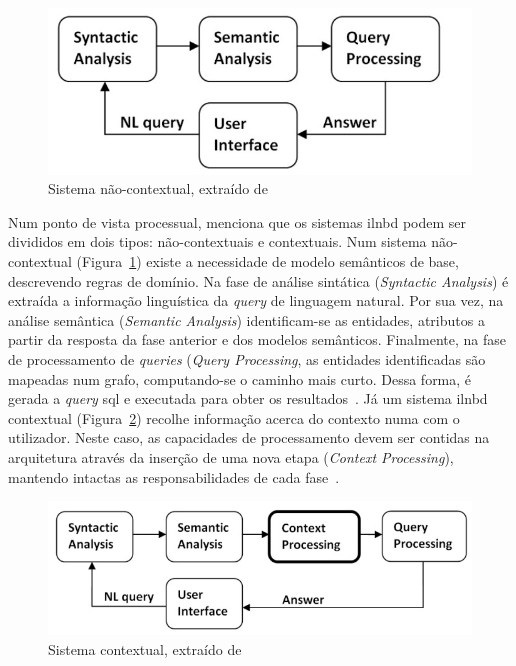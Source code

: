 \begin{figure}[!h]
    \centering
    \includegraphics[width=.6\textwidth]{ch03/assets/non_contextual_nlidb.jpg}
    \caption{Sistema  não-contextual, extraído de~\textcite{novel_approach_towards_incorporating_context_processing_nlidb}}
    \label{fig:noncontextual_nlidb}
\end{figure}

Num ponto de vista processual, \textcite{novel_approach_towards_incorporating_context_processing_nlidb} menciona que os sistemas \gls{ilnbd} podem ser divididos em dois tipos: não-contextuais e contextuais. Num sistema não-contextual (Figura~\ref{fig:noncontextual_nlidb}) existe a necessidade de modelo semânticos de base, descrevendo regras de domínio. Na fase de análise sintática (\textit{Syntactic Analysis}) é extraída a informação linguística da \textit{query} de linguagem natural. Por sua vez, na análise semântica (\textit{Semantic Analysis}) identificam-se as entidades, atributos a partir da resposta da fase anterior e dos modelos semânticos. Finalmente, na fase de processamento de \textit{queries} (\textit{Query Processing}, as entidades identificadas são mapeadas num grafo, computando-se o caminho mais curto. Dessa forma, é gerada a \textit{query} \gls{sql} e executada para obter os resultados~\parencite{novel_approach_towards_incorporating_context_processing_nlidb}. Já um sistema \gls{ilnbd} contextual (Figura~\ref{fig:contextual_nlidb}) recolhe informação acerca do contexto numa  com o utilizador. Neste caso, as capacidades de processamento devem ser contidas na arquitetura através da inserção de uma nova etapa (\textit{Context Processing}), mantendo intactas as responsabilidades de cada fase~\parencite{novel_approach_towards_incorporating_context_processing_nlidb}.

\begin{figure}[!h]
    \centering
    \includegraphics[width=.7\textwidth]{ch03/assets/contextual_nlidb.jpg}
    \caption{Sistema  contextual, extraído de~\textcite{novel_approach_towards_incorporating_context_processing_nlidb}}
    \label{fig:contextual_nlidb}
\end{figure}

